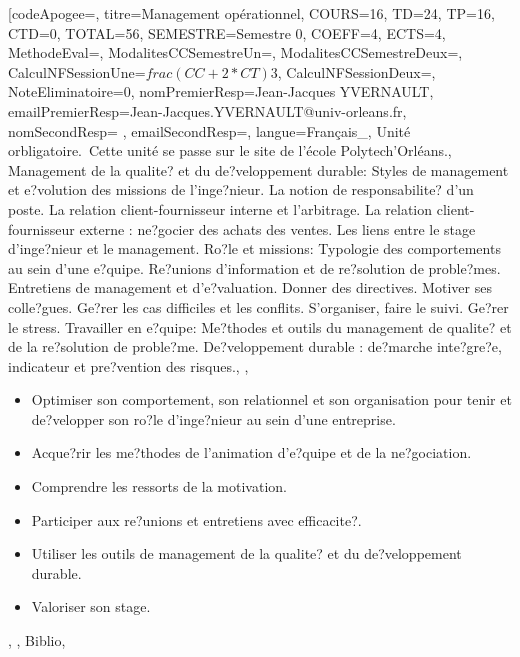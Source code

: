 \vfill


\module[codeApogee={},
titre={Management opérationnel},
COURS={16},
TD={24},
TP={16},
CTD={0},
TOTAL={56},
SEMESTRE={Semestre 0},
COEFF={4},
ECTS={4},
MethodeEval={},
ModalitesCCSemestreUn={},
ModalitesCCSemestreDeux={},
CalculNFSessionUne={$frac{(CC+2*CT)}{3}$},
CalculNFSessionDeux={},
NoteEliminatoire={0},
nomPremierResp={Jean-Jacques YVERNAULT},
emailPremierResp={Jean-Jacques.YVERNAULT@univ-orleans.fr},
nomSecondResp={ },
emailSecondResp={},
langue={Français_},
{Unité orbligatoire.\
Cette unité se passe sur le site de l'école Polytech'Orléans.},
{Management de la qualite? et du de?veloppement durable:
Styles de management et e?volution des missions de l'inge?nieur. La notion de responsabilite? d'un poste. 
La relation client-fournisseur interne et l'arbitrage. La relation client-fournisseur externe : ne?gocier des achats des ventes.
Les liens entre le stage d'inge?nieur et le management.
Ro?le et missions:
Typologie des comportements au sein d'une e?quipe. Re?unions d'information et de re?solution de proble?mes. 
Entretiens de management et d'e?valuation. Donner des directives. Motiver ses colle?gues. Ge?rer les cas difficiles et les conflits. 
S'organiser, faire le suivi. Ge?rer le stress.
Travailler en e?quipe:
Me?thodes et outils du management de qualite? et de la re?solution de proble?me. De?veloppement durable : 
de?marche inte?gre?e, indicateur et pre?vention des risques.},
{},
{\begin{itemize}
\item Optimiser son comportement, son relationnel et son organisation pour tenir et de?velopper son ro?le d'inge?nieur au sein d'une entreprise.
\item Acque?rir les me?thodes de l'animation d'e?quipe et de la ne?gociation.
\item Comprendre les ressorts de la motivation.
\item Participer aux re?unions et entretiens avec efficacite?.
\item Utiliser les outils de management de la qualite? et du de?veloppement durable.
\item Valoriser son stage.
\end{itemize}},
{},
{Biblio},

\vfill


